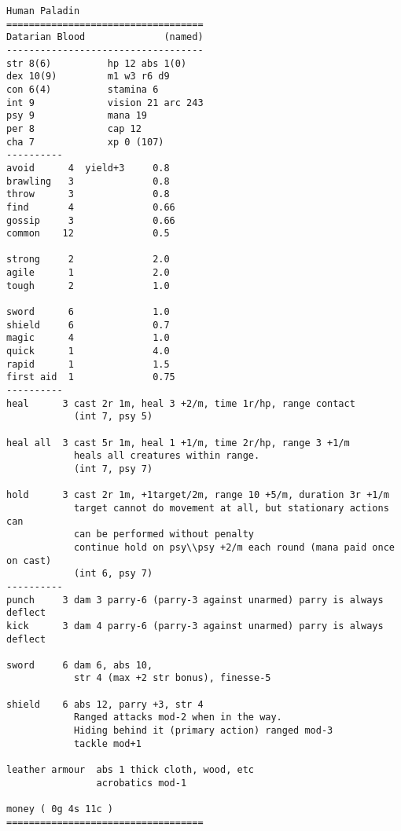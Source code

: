 \pagebreak[1]
\tiny \begin{samepage} \begin{verbatim}
Human Paladin
===================================
Datarian Blood              (named)
-----------------------------------
str 8(6)          hp 12 abs 1(0)
dex 10(9)         m1 w3 r6 d9
con 6(4)          stamina 6
int 9             vision 21 arc 243
psy 9             mana 19
per 8             cap 12
cha 7             xp 0 (107)
----------
avoid      4  yield+3     0.8
brawling   3              0.8
throw      3              0.8
find       4              0.66
gossip     3              0.66
common    12              0.5

strong	   2              2.0
agile	   1              2.0
tough	   2              1.0

sword	   6              1.0
shield	   6              0.7
magic	   4              1.0
quick      1              4.0
rapid	   1              1.5
first aid  1              0.75
----------
heal	  3 cast 2r 1m, heal 3 +2/m, time 1r/hp, range contact
            (int 7, psy 5)

heal all  3 cast 5r 1m, heal 1 +1/m, time 2r/hp, range 3 +1/m
            heals all creatures within range.
            (int 7, psy 7)

hold	  3 cast 2r 1m, +1target/2m, range 10 +5/m, duration 3r +1/m
            target cannot do movement at all, but stationary actions can
            can be performed without penalty
            continue hold on psy\\psy +2/m each round (mana paid once on cast)
            (int 6, psy 7)
----------
punch     3 dam 3 parry-6 (parry-3 against unarmed) parry is always deflect
kick      3 dam 4 parry-6 (parry-3 against unarmed) parry is always deflect

sword     6 dam 6, abs 10,
            str 4 (max +2 str bonus), finesse-5

shield    6 abs 12, parry +3, str 4
            Ranged attacks mod-2 when in the way.
            Hiding behind it (primary action) ranged mod-3
            tackle mod+1

leather armour  abs 1 thick cloth, wood, etc
                acrobatics mod-1

money ( 0g 4s 11c )
===================================
\end{verbatim} \end{samepage} \normalsize


\

